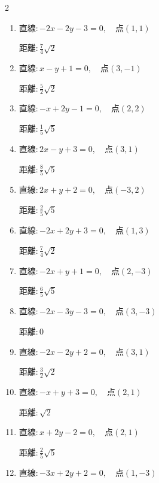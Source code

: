 \begin{multicols}{2}
\begin{enumerate}
        $\displaystyle 距離 : \frac{9}{13}\sqrt{13}$

  \item $直線:-2x-2y-3=0,\quad 点 ( 1, 1 )$

        $\displaystyle 距離 : \frac{7}{4}\sqrt{2}$

  \item $直線:x-y+1=0,\quad 点 ( 3, -1 )$

        $\displaystyle 距離 : \frac{5}{2}\sqrt{2}$

  \item $直線:-x+2y-1=0,\quad 点 ( 2, 2 )$

        $\displaystyle 距離 : \frac{1}{5}\sqrt{5}$

  \item $直線:2x-y+3=0,\quad 点 ( 3, 1 )$

        $\displaystyle 距離 : \frac{8}{5}\sqrt{5}$

  \item $直線:2x+y+2=0,\quad 点 ( -3, 2 )$

        $\displaystyle 距離 : \frac{2}{5}\sqrt{5}$

  \item $直線:-2x+2y+3=0,\quad 点 ( 1, 3 )$

        $\displaystyle 距離 : \frac{7}{4}\sqrt{2}$

  \item $直線:-2x+y+1=0,\quad 点 ( 2, -3 )$

        $\displaystyle 距離 : \frac{6}{5}\sqrt{5}$

  \item $直線:-2x-3y-3=0,\quad 点 ( 3, -3 )$

        $\displaystyle 距離 : 0$

\columnbreak %

\resetques

  \item $直線:-2x-2y+2=0,\quad 点 ( 3, 1 )$

        $\displaystyle 距離 : \frac{3}{2}\sqrt{2}$

  \item $直線:-x+y+3=0,\quad 点 ( 2, 1 )$

        $\displaystyle 距離 : \sqrt{2}$

  \item $直線:x+2y-2=0,\quad 点 ( 2, 1 )$

        $\displaystyle 距離 : \frac{2}{5}\sqrt{5}$

  \item $直線:-3x+2y+2=0,\quad 点 ( 1, -3 )$


\end{enumerate}
\end{multicols}
